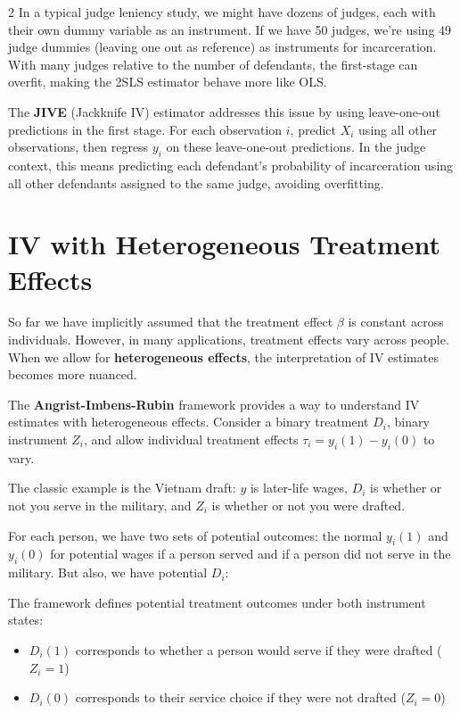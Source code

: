 \documentclass[12pt]{article}
\begin{document}
\begin{multicols}{2}
In a typical judge leniency study, we might have dozens of judges, each with their own dummy variable as an instrument.
If we have 50 judges, we're using 49 judge dummies (leaving one out as reference) as instruments for incarceration.
With many judges relative to the number of defendants, the first-stage can overfit, making the 2SLS estimator behave more like OLS.

The \textbf{JIVE} (Jackknife IV) estimator addresses this issue by using leave-one-out predictions in the first stage.
For each observation $i$, predict $X_i$ using all other observations, then regress $y_i$ on these leave-one-out predictions.
In the judge context, this means predicting each defendant's probability of incarceration using all other defendants assigned to the same judge, avoiding overfitting.

\section*{IV with Heterogeneous Treatment Effects}

So far we have implicitly assumed that the treatment effect $\beta$ is constant across individuals.
However, in many applications, treatment effects vary across people.
When we allow for \textbf{heterogeneous effects}, the interpretation of IV estimates becomes more nuanced.

The \textbf{Angrist-Imbens-Rubin} framework provides a way to understand IV estimates with heterogeneous effects.
Consider a binary treatment $D_i$, binary instrument $Z_i$, and allow individual treatment effects $\tau_i = y_i(1) - y_i(0)$ to vary.

The classic example is the Vietnam draft: $y$ is later-life wages, $D_i$ is whether or not you serve in the military, and $Z_i$ is whether or not you were drafted.

For each person, we have two sets of potential outcomes: the normal $y_i(1)$ and $y_i(0)$ for potential wages if a person served and if a person did not serve in the military.
But also, we have potential $D_i$: 

The framework defines potential treatment outcomes under both instrument states:
\begin{itemize}
  \item $D_i(1)$ corresponds to whether a person would serve if they were drafted ($Z_i = 1$)
  \item $D_i(0)$ corresponds to their service choice if they were not drafted ($Z_i = 0$)
\end{itemize}


\end{multicols}
\end{document}
